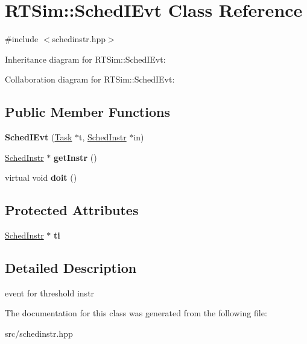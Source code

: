 \hypertarget{classRTSim_1_1SchedIEvt}{}\section{R\+T\+Sim\+:\+:Sched\+I\+Evt Class Reference}
\label{classRTSim_1_1SchedIEvt}


{\ttfamily \#include $<$schedinstr.\+hpp$>$}



Inheritance diagram for R\+T\+Sim\+:\+:Sched\+I\+Evt\+:


Collaboration diagram for R\+T\+Sim\+:\+:Sched\+I\+Evt\+:
\subsection*{Public Member Functions}
\begin{DoxyCompactItemize}
\item 
{\bfseries Sched\+I\+Evt} (\hyperlink{classRTSim_1_1Task}{Task} $\ast$t, \hyperlink{classRTSim_1_1SchedInstr}{Sched\+Instr} $\ast$in)\hypertarget{classRTSim_1_1SchedIEvt_ab6af6cdbdf99de05203aafb9b054e987}{}\label{classRTSim_1_1SchedIEvt_ab6af6cdbdf99de05203aafb9b054e987}

\item 
\hyperlink{classRTSim_1_1SchedInstr}{Sched\+Instr} $\ast$ {\bfseries get\+Instr} ()\hypertarget{classRTSim_1_1SchedIEvt_abd7995ee48b344a46c908d3a226cd1e5}{}\label{classRTSim_1_1SchedIEvt_abd7995ee48b344a46c908d3a226cd1e5}

\item 
virtual void {\bfseries doit} ()\hypertarget{classRTSim_1_1SchedIEvt_a4eb72d7cd22595800bb18511de6cf50d}{}\label{classRTSim_1_1SchedIEvt_a4eb72d7cd22595800bb18511de6cf50d}

\end{DoxyCompactItemize}
\subsection*{Protected Attributes}
\begin{DoxyCompactItemize}
\item 
\hyperlink{classRTSim_1_1SchedInstr}{Sched\+Instr} $\ast$ {\bfseries ti}\hypertarget{classRTSim_1_1SchedIEvt_a0159b43f4bc1107462b4f40f72a0cd14}{}\label{classRTSim_1_1SchedIEvt_a0159b43f4bc1107462b4f40f72a0cd14}

\end{DoxyCompactItemize}


\subsection{Detailed Description}
event for threshold instr 

The documentation for this class was generated from the following file\+:\begin{DoxyCompactItemize}
\item 
src/schedinstr.\+hpp\end{DoxyCompactItemize}
